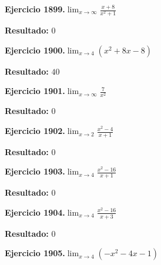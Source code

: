 \documentclass[10pt,a4paper]{article}
\begin{document}
\begin{ejbox}
\textbf{Ejercicio 1899.}\quad $\lim_{x\to \infty} \frac{x + 8}{x^2 + 1}$
\end{ejbox}

\begin{solbox}
\textbf{Resultado:} \(\displaystyle 0\)
\end{solbox}

\newpage
\begin{ejbox}
\textbf{Ejercicio 1900.}\quad $\lim_{x\to 4} (x^2 +8x -8)$
\end{ejbox}

\begin{solbox}
\textbf{Resultado:} \(\displaystyle 40\)
\end{solbox}

\begin{ejbox}
\textbf{Ejercicio 1901.}\quad $\lim_{x\to \infty} \frac{7}{x^2}$
\end{ejbox}

\begin{solbox}
\textbf{Resultado:} \(\displaystyle 0\)
\end{solbox}

\begin{ejbox}
\textbf{Ejercicio 1902.}\quad $\lim_{x\to 2} \frac{x^2-4}{x+1}$
\end{ejbox}

\begin{solbox}
\textbf{Resultado:} \(\displaystyle 0\)
\end{solbox}

\newpage
\begin{ejbox}
\textbf{Ejercicio 1903.}\quad $\lim_{x\to 4} \frac{x^2-16}{x+1}$
\end{ejbox}

\begin{solbox}
\textbf{Resultado:} \(\displaystyle 0\)
\end{solbox}

\begin{ejbox}
\textbf{Ejercicio 1904.}\quad $\lim_{x\to 4} \frac{x^2-16}{x+3}$
\end{ejbox}

\begin{solbox}
\textbf{Resultado:} \(\displaystyle 0\)
\end{solbox}

\begin{ejbox}
\textbf{Ejercicio 1905.}\quad $\lim_{x\to 4} (-x^2 -4x -1)$
\end{ejbox}
\end{document}
